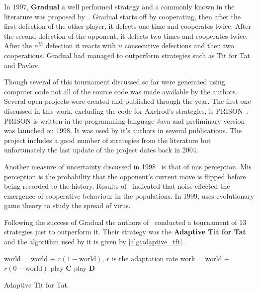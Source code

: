 \documentclass{article}
\theoremstyle{definition}
\begin{document}
In 1997, \textbf{Gradual} a well performed strategy and a commonly known in the
literature was proposed by~\cite{Beaufils1997}. Gradual starts off by cooperating,
then after the first defection of the other player, it defects one time and cooperates
twice. After the second defection of the opponent, it defects two times and cooperates
twice. After the \(n^{th}\) defection it reacts with \(n\) consecutive defections 
and then two cooperations. Gradual had managed to outperform strategies such
as Tit for Tat and Pavlov.

Though several of this tournament discussed so far were generated using computer
code not all of the source code was made available by the authors. Several
open projects were created and published through the year. The first one
discussed in this work, excluding the code for Axelrod's strategies, is 
PRISON~\cite{prison}. PRISON is written in the programming language Java and
preliminary version was launched on 1998. It was used by it's authors in several
publications. The project includes a good number of strategies from the
literature but unfortunately the last update of the project dates back in 2004.

Another measure of uncertainty discussed in 1998~\cite{Hoffmann1998} is that of
mis perception. Mis perception is the probability that the opponent's current
move is flipped before being recorded to the history. Results of~\cite{Hoffmann1998}
indicated that noise effected the emergence of cooperative behaviour in the
populations. In 1999, \cite{Turner1999} uses evolutionary game theory to study
the spread of virus.

Following the success of Gradual the authors of~\cite{tzafestas-2000a}
conducted a tournament of 13 strategies just to outperform it. Their strategy
was the \textbf{Adaptive Tit for Tat} and the algorithm used by it is given by
\ref{alg:adaptive_tft}.

\begin{algorithm}
\begin{algorithmic}[1]
     \STATE world = world + \(r(1-\text{world})\), \(r\) is the adaptation rate
    \ELSE
     \STATE work = world + \(r(0 - \text{world})\)
     \ENDIF
        \STATE play \textbf{C}
    \ELSE
    \STATE play \textbf{D}
    \ENDIF
\end{algorithmic}
\caption{Adaptive Tit for Tat.}
\label{alg:adaptive_tft}
\end{algorithm}
\end{document}
